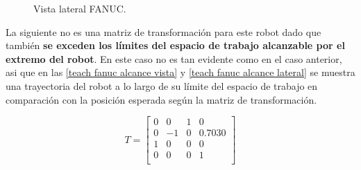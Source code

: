 \documentclass[a4paper,12pt]{article}
\begin{document}
\begin{figure}[H]
    \centering
    \begin{adjustbox}{scale = 0.65, max width=\columnwidth}
    \end{adjustbox}
    \caption{Vista lateral FANUC.}
    \label{alcance fanuc}
\end{figure}

La siguiente no es una matriz de transformación para este robot dado que también \textbf{se exceden
los límites del espacio de trabajo alcanzable por el extremo del robot}. En este caso no es tan evidente como en el caso anterior,
asi que en las \cref{teach fanuc alcance vista} y \cref{teach fanuc alcance lateral} se muestra una trayectoria del robot a lo largo de su límite del espacio de trabajo en comparación con la posición
esperada según la matriz de transformación.

\begin{equation*}
    T = 
    \begin{bmatrix}
        0  &  0   & 1 & 0      \\
        0  &  -1  & 0 & 0.7030 \\
        1  &  0   & 0 & 0      \\
        0  &  0   & 0 & 1      \\
    \end{bmatrix}
\end{equation*}
\end{document}
